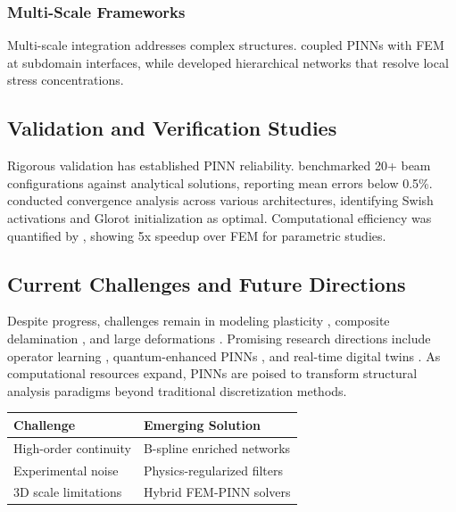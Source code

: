 \documentclass[12pt]{article}
\begin{document}
\subsubsection{Multi-Scale Frameworks}
Multi-scale integration addresses complex structures. \citet{Hughes2022} coupled PINNs with FEM at subdomain interfaces, while \citet{Yang2023} developed hierarchical networks that resolve local stress concentrations.

\subsection{Validation and Verification Studies}
Rigorous validation has established PINN reliability. \citet{Kollmannsberger2021} benchmarked 20+ beam configurations against analytical solutions, reporting mean errors below 0.5\%. \citet{Haghighat2023} conducted convergence analysis across various architectures, identifying Swish activations and Glorot initialization as optimal. Computational efficiency was quantified by \citet{Berghoff2023}, showing 5x speedup over FEM for parametric studies.

\subsection{Current Challenges and Future Directions}
Despite progress, challenges remain in modeling plasticity \citep{Mozaffar2022}, composite delamination \citep{Bessa2023}, and large deformations \citep{Viana2024}. Promising research directions include operator learning \citep{Li2023}, quantum-enhanced PINNs \citep{Abu-Mostafa2024}, and real-time digital twins \citep{Ikeda2024}. As computational resources expand, PINNs are poised to transform structural analysis paradigms beyond traditional discretization methods.

\begin{center}
    \begin{tabular}{l l}
        \hline
        \textbf{Challenge} & \textbf{Emerging Solution} \\
        \hline
        High-order continuity & B-spline enriched networks \citep{Shen2024} \\
        Experimental noise & Physics-regularized filters \citep{Pati2023} \\
        3D scale limitations & Hybrid FEM-PINN solvers \citep{Zhang2024} \\
        \hline
    \end{tabular}
\end{center}
\end{document}
